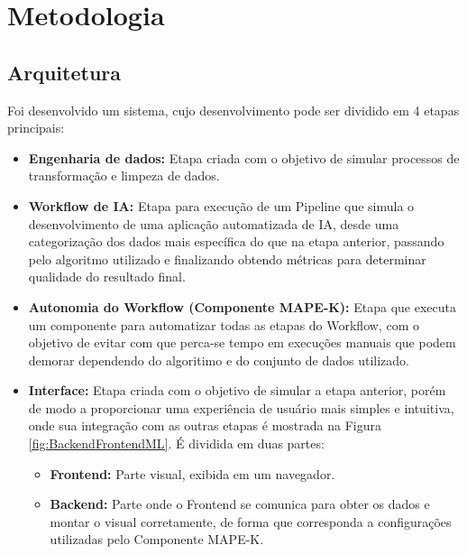 \documentclass{article}
\begin{document}
\section{Metodologia}

\subsection{Arquitetura}

Foi desenvolvido um sistema, cujo desenvolvimento pode ser dividido em 4 etapas principais:

\begin{itemize}
    \item {\textbf{Engenharia de dados:}} Etapa criada com o objetivo de simular processos de transformação e limpeza de dados.
    \item {\textbf{Workflow de IA:}} Etapa para execução de um Pipeline que simula o desenvolvimento de uma aplicação automatizada de IA, desde uma categorização dos dados mais específica do que na etapa anterior, passando pelo algoritmo utilizado e finalizando obtendo métricas para determinar qualidade do resultado final.
    \item {\textbf{Autonomia do Workflow (Componente MAPE-K):}} Etapa que executa um componente para automatizar todas as etapas do Workflow, com o objetivo de evitar com que perca-se tempo em execuções manuais que podem demorar dependendo do algoritimo e do conjunto de dados utilizado.
    \item {\textbf{Interface:}} Etapa criada com o objetivo de simular a etapa anterior, porém de modo a proporcionar uma experiência de usuário mais simples e intuitiva, onde sua integração com as outras etapas é mostrada na Figura \ref{fig:BackendFrontendML}. É dividida em duas partes:
    \begin{itemize}
        \item {\textbf{Frontend:}} Parte visual, exibida em um navegador.
        \item \textbf{{Backend:}} Parte onde o Frontend se comunica para obter os dados e montar o visual corretamente, de forma que corresponda a configurações utilizadas pelo Componente MAPE-K.
    \end{itemize}
\end{itemize}
\end{document}
